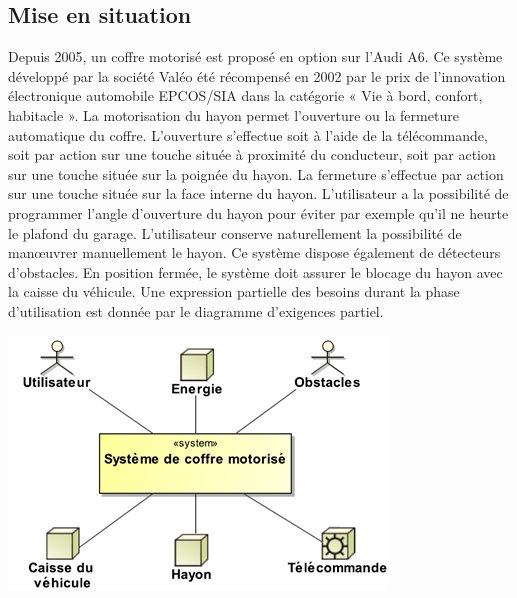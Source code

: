 \documentclass[10pt,fleqn]{article} %
\begin{document}
\def\pathfig{images}

\vspace{4.5cm}
\pagestyle{fancy}
\thispagestyle{plain}

\def\columnseprulecolor{\color{ocre}}
\setlength{\columnseprule}{0.4pt} 

\def\pathfig{images}


\ifprof
\begin{multicols}{2}
\else
\begin{multicols}{2}
\fi

\subsection*{Mise en situation}


Depuis 2005, un coffre motorisé est proposé en option sur l’Audi A6. Ce système développé par la société Valéo été récompensé en 2002 par le prix de l’innovation électronique automobile EPCOS/SIA dans la catégorie « Vie à bord, confort, habitacle ». La motorisation du hayon permet l’ouverture ou la fermeture automatique du coffre. L’ouverture s’effectue soit à l’aide de la télécommande, soit par action sur une touche située à proximité du conducteur, soit par action sur une touche située sur la poignée du hayon. La fermeture s’effectue par action sur une touche située sur la face interne du hayon. L’utilisateur a la possibilité de programmer l’angle d’ouverture du hayon pour éviter par exemple qu’il ne heurte le plafond du garage. L’utilisateur conserve naturellement la possibilité de man\oe{}uvrer manuellement le hayon. Ce système dispose également de détecteurs d’obstacles. En position fermée, le système doit assurer le blocage du hayon avec la caisse du véhicule. Une expression partielle des besoins durant la phase d’utilisation est donnée par le diagramme d’exigences partiel.


\begin{center}
\includegraphics[width=.8\linewidth]{images/fig_02.png}


\end{center}
\end{multicols}
\end{multicols}
\end{document}
